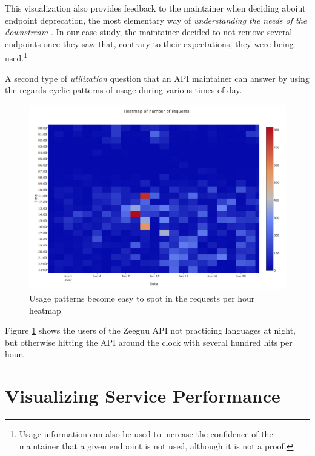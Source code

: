 \documentclass[conference]{IEEEtran}
\begin{document}
  This visualization also provides feedback to the maintainer when deciding aboiut endpoint deprecation, the most elementary way of {\em understanding the needs of the downstream} \cite{Haen14a}. In our case study, the maintainer decided to not remove several endpoints once they saw that, contrary to their expectations, they were being used.\footnote{Usage information can also be used to increase the confidence of the maintainer that a given endpoint is not used, although it is not a proof.}

  \niceseparator

  A second type of {\em utilization} question that an API maintainer can answer by using the \tool regards cyclic patterns of usage during various times of day. 


    \begin{figure}[h!]
      \centering
      \includegraphics[width=\linewidth]{daily_patterns}
      \caption{Usage patterns become easy to spot in the requests per hour heatmap}
      \label{fig:dp}
    \end{figure}


  Figure \ref{fig:dp} shows the users of the Zeeguu API not practicing  languages at night, but otherwise hitting the API around the clock with several hundred hits per hour. 


\newpage
\section{Visualizing Service Performance}
\end{document}
